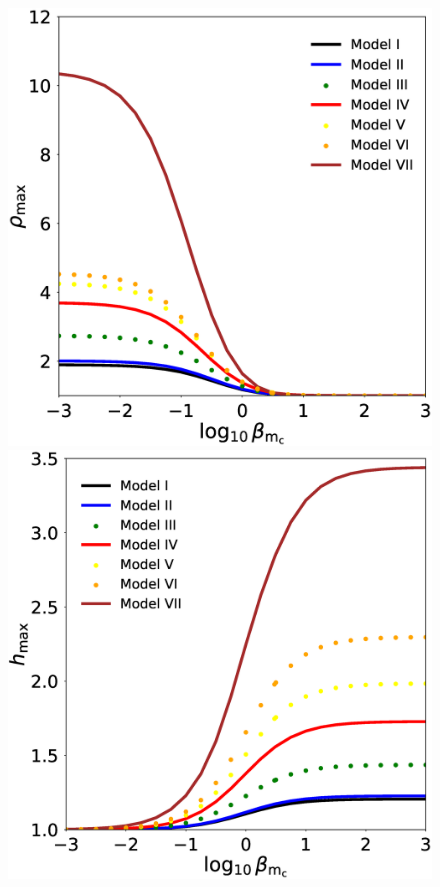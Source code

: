\documentclass[twocolumn,aps,showpacs,showkeys,prd,superscriptaddress,byrevtex, amsmath]{revtex4-1}
\begin{document}
\begin{figure}
\centering
\includegraphics[scale=0.2]{figures/fig7_HBH_dens.eps}
\hspace{-0.cm}
\includegraphics[scale=0.2]{figures/fig7_HBH_enth.eps}

\end{figure}
\end{document}
